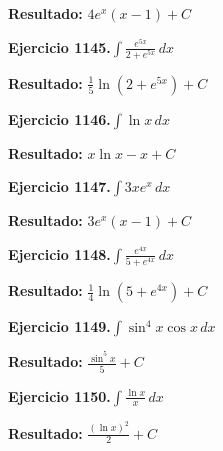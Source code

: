 \documentclass[10pt,a4paper]{article}
\begin{document}
\begin{solbox}
\textbf{Resultado:} \(\displaystyle 4e^x(x-1) + C\)
\end{solbox}

\begin{ejbox}
\textbf{Ejercicio 1145.}\quad $\int \frac{e^{5x}}{2+e^{5x}}\,dx$
\end{ejbox}

\begin{solbox}
\textbf{Resultado:} \(\displaystyle \frac{1}{5}\ln(2+e^{5x}) + C\)
\end{solbox}

\begin{ejbox}
\textbf{Ejercicio 1146.}\quad $\int \ln x\,dx$
\end{ejbox}

\begin{solbox}
\textbf{Resultado:} \(\displaystyle x\ln x - x + C\)
\end{solbox}

\newpage
\begin{ejbox}
\textbf{Ejercicio 1147.}\quad $\int 3x e^{x}\,dx$
\end{ejbox}

\begin{solbox}
\textbf{Resultado:} \(\displaystyle 3e^x(x-1) + C\)
\end{solbox}

\begin{ejbox}
\textbf{Ejercicio 1148.}\quad $\int \frac{e^{4x}}{5+e^{4x}}\,dx$
\end{ejbox}

\begin{solbox}
\textbf{Resultado:} \(\displaystyle \frac{1}{4}\ln(5+e^{4x}) + C\)
\end{solbox}

\begin{ejbox}
\textbf{Ejercicio 1149.}\quad $\int \sin^{4}x \cos x\,dx$
\end{ejbox}

\begin{solbox}
\textbf{Resultado:} \(\displaystyle \frac{\sin^{5}x}{5} + C\)
\end{solbox}

\newpage
\begin{ejbox}
\textbf{Ejercicio 1150.}\quad $\int \frac{\ln x}{x}\,dx$
\end{ejbox}

\begin{solbox}
\textbf{Resultado:} \(\displaystyle \frac{(\ln x)^2}{2} + C\)
\end{solbox}
\end{document}

